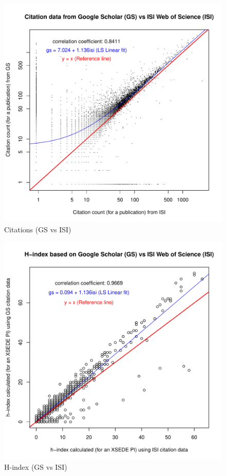 \documentclass{sig-alternate}
\begin{document}
\begin{figure}[htb] 
  \centering 
    \includegraphics[width=1.0\columnwidth]{images/11_gs_vs_isi_cites.pdf} 
  \caption{Citations (GS vs ISI)}\label{F:gs-vs-isi-cites} 
\end{figure} 
 
\begin{figure}[htb] 
  \centering 
    \includegraphics[width=1.0\columnwidth]{images/11_gs_vs_isi_hindex.pdf} 
  \caption{H-index (GS vs ISI)}\label{F:gs-vs-isi-hindex} 
\end{figure} 
 
\end{document}
